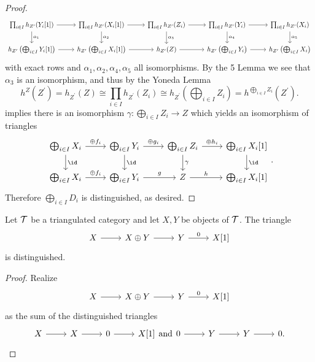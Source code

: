 \documentclass[10pt]{amsart}
\begin{document}
\begin{prop}
\begin{proof}
    $$\begin{tikzcd} 
      \prod_{i \in I}h_{Z^\prime}(Y_i[1]) \arrow{r}\arrow{d}{\alpha_1} & \prod_{i \in I}h_{Z^\prime}(X_i[1]) \arrow{r}\arrow{d}{\alpha_2} & \prod_{i \in I}h_{Z^\prime}(Z_i) \arrow{r}\arrow{d}{\alpha_3} & \prod_{i \in I}h_{Z^\prime}(Y_i) \arrow{r}\arrow{d}{\alpha_4} & \prod_{i \in I}h_{Z^\prime}(X_i)\arrow{d}{\alpha_5}\\
      h_{Z^\prime}\left(\bigoplus_{i \in I}Y_i[1]\right) \arrow{r} & h_{Z^\prime}\left(\bigoplus_{i \in I}X_i[1]\right) \arrow{r} & h_{Z^\prime}(Z) \arrow{r} & h_{Z^\prime}\left(\bigoplus_{i \in I}Y_i\right) \arrow{r} & h_{Z^\prime}\left(\bigoplus_{i \in I} X_i\right)
    \end{tikzcd}$$
    with exact rows and $\alpha_1, \alpha_2, \alpha_4, \alpha_5$ all isomorphisms.
    By the 5 Lemma we see that $\alpha_3$ is an isomorphism, and thus by the Yoneda Lemma
    $$h^Z(Z^\prime) = h_{Z^\prime}(Z) \cong \prod_{i \in I}h_{Z^\prime}(Z_i) \cong h_{Z^\prime}\left(\bigoplus_{i \in I}Z_i\right) = h^{\bigoplus_{i \in I} Z_i}(Z^\prime).$$
    implies there is an isomorphism $\gamma : \bigoplus_{i \in I} Z_i \rightarrow Z$ which yields an isomorphism of triangles
    $$\begin{tikzcd}
      \bigoplus_{i \in I} X_i \arrow{d}{\id}\arrow{r}{\oplus f_i} & \bigoplus_{i \in I}Y_i \arrow{d}{\id}\arrow{r}{\oplus g_i} & \bigoplus_{i \in I} Z_i \arrow{d}{\gamma}\arrow{r}{\oplus h_i} & \bigoplus_{i \in I} X_i[1]\arrow{d}{\id}\\
      \bigoplus_{i \in I} X_i \arrow{r}{\oplus f_i} & \bigoplus_{i \in I}Y_i \arrow{r}{g} & Z \arrow{r}{h} & \bigoplus_{i \in I} X_i[1]
    \end{tikzcd}.$$
    Therefore $\bigoplus_{i \in I}D_i$ is distinguished, as desired.
  \end{proof}
\end{prop}

\begin{cor}\label{corsumtriangles}
  Let $\mathcal{T}$ be a triangulated category and let $X,Y$ be objects of $\mathcal{T}$.
  The triangle
  $$\begin{tikzcd}
    X \arrow{r} & X \oplus Y \arrow{r} & Y \arrow{r}{0} & X[1]
  \end{tikzcd}$$
  is distinguished.
  
  \begin{proof}
    Realize 
    $$\begin{tikzcd}
      X \arrow{r} & X \oplus Y \arrow{r} & Y \arrow{r}{0} & X[1]
    \end{tikzcd}$$
    as the sum of the distinguished triangles
    $$\begin{tikzcd}
      X \arrow{r} & X \arrow{r} & 0\arrow{r} & X[1]
    \end{tikzcd}
    \text{and}
    \begin{tikzcd}
      0 \arrow{r} & Y \arrow{r} & Y \arrow{r} & 0.
    \end{tikzcd}$$
  \end{proof}
\end{cor}
\end{document}
